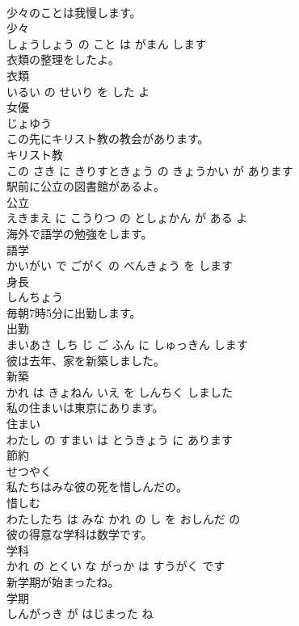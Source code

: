\documentclass[8pt]{extreport}
\begin{document}
\begin{CJK}{UTF8}{min}
\\	少々のことは我慢します。	
\\	少々 
\\	しょうしょう の こと は がまん します			
\\	衣類の整理をしたよ。	
\\	衣類 
\\	いるい の せいり を した よ			
\\	女優	
\\	じょゆう		
\\	この先にキリスト教の教会があります。	
\\	キリスト教 
\\	この さき に きりすときょう の きょうかい が あります			
\\	駅前に公立の図書館があるよ。	
\\	公立 
\\	えきまえ に こうりつ の としょかん が ある よ			
\\	海外で語学の勉強をします。	
\\	語学 
\\	かいがい で ごがく の べんきょう を します			
\\	身長	
\\	しんちょう		
\\	毎朝7時5分に出勤します。	
\\	出勤 
\\	まいあさ しち じ ご ふん に しゅっきん します			
\\	彼は去年、家を新築しました。	
\\	新築 
\\	かれ は きょねん いえ を しんちく しました			
\\	私の住まいは東京にあります。	
\\	住まい 
\\	わたし の すまい は とうきょう に あります			
\\	節約	
\\	せつやく		
\\	私たちはみな彼の死を惜しんだの。	
\\	惜しむ 
\\	わたしたち は みな かれ の し を おしんだ の			
\\	彼の得意な学科は数学です。	
\\	学科 
\\	かれ の とくい な がっか は すうがく です			
\\	新学期が始まったね。	
\\	学期 
\\	しんがっき が はじまった ね			

\end{CJK}
\end{document}
